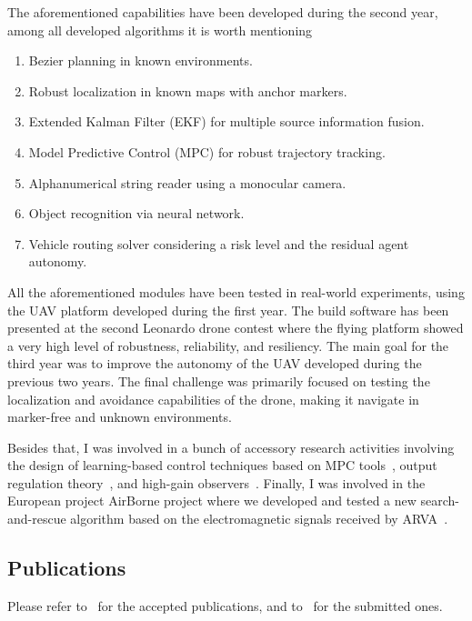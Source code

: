The aforementioned capabilities have been developed during the second year, among all developed algorithms it is worth mentioning
\begin{enumerate}
	\item B\acuteacc ezier planning in known environments.
	\item Robust localization in known maps with anchor markers.
	\item Extended Kalman Filter (EKF) for multiple source information fusion.
	\item Model Predictive Control (MPC) for robust trajectory tracking.
	\item Alphanumerical string reader using a monocular camera.
	\item Object recognition via neural network.
	\item Vehicle routing solver considering a risk level and the residual agent autonomy.
\end{enumerate}
All the aforementioned modules have been tested in real-world experiments, using the UAV platform developed during the first year.
The build software has been presented at the second Leonardo drone contest where the flying platform showed a very high level of robustness,
reliability, and resiliency. The main goal for the third year was to improve the autonomy of the UAV developed during the previous two years.
The final challenge was primarily focused on testing the localization and avoidance capabilities of the drone, making it navigate in 
marker-free and unknown environments.

Besides that, I was involved in a bunch of accessory research activities involving the design of learning-based control techniques
based on MPC tools~\cite{gentilini2022model}, output regulation theory~\cite{gentilini2022adaptive, gentilini2022data}, and
high-gain observers~\cite{trimarchi2022data}. Finally, I was involved in the European project AirBorne project where we developed
and tested a new search-and-rescue algorithm based on the electromagnetic signals received by ARVA~\cite{azzollini2021uav}.

\subsection{Publications}
Please refer to~\cite{gentilini2022adaptive, gentilini2021trajectory, gentilini2022data, trimarchi2022data, gentilini2022model}
for the accepted publications, and to~\cite{gentilini2022direct, azzollini2021uav} for the submitted ones.

